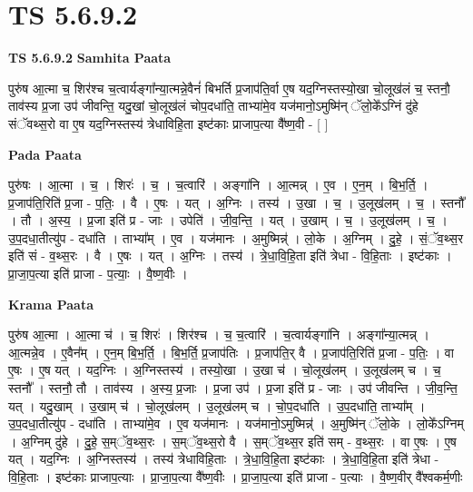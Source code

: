 \documentclass[17pt]{extarticle}
\begin{document}
\section{ TS 5.6.9.2 }

\textbf{TS 5.6.9.2 } \newline
\textbf{Samhita Paata} \newline

पुरु॑ष आ॒त्मा च॒ शिर॑श्च च॒त्वार्यङ्गा᳚न्या॒त्मन्ने॒वैनं॑ बिभर्ति प्र॒जाप॑ति॒र्वा ए॒ष यद॒ग्निस्तस्यो॒खा चो॒लूख॑लं च॒ स्तनौ॒ ताव॑स्य प्र॒जा उप॑ जीवन्ति॒ यदु॒खां चो॒लूख॑लं चोप॒दधा॑ति॒ ताभ्या॑मे॒व यज॑मानो॒ऽमुष्मि॑न् ॅलो॒के᳚ऽग्निं दु॑हे संॅवथ्स॒रो वा ए॒ष यद॒ग्निस्तस्य॑ त्रेधाविहि॒ता इष्ट॑काः प्राजाप॒त्या वै᳚ष्ण॒वी - [  ] \newline

\textbf{Pada Paata} \newline

पुरु॑षः । आ॒त्मा । च॒ । शिरः॑ । च॒ । च॒त्वारि॑ । अङ्गा॑नि । आ॒त्मन्न् । ए॒व । ए॒न॒म् । बि॒भ॒र्ति॒ । प्र॒जाप॑ति॒रिति॑ प्र॒जा - प॒तिः॒ । वै । ए॒षः । यत् । अ॒ग्निः । तस्य॑ । उ॒खा । च॒ । उ॒लूख॑लम् । च॒ । स्तनौ᳚ । तौ । अ॒स्य॒ । प्र॒जा इति॑ प्र - जाः । उपेति॑ । जी॒व॒न्ति॒ । यत् । उ॒खाम् । च॒ । उ॒लूख॑लम् । च॒ । उ॒प॒दधा॒तीत्यु॑प - दधा॑ति । ताभ्या᳚म् । ए॒व । यज॑मानः । अ॒मुष्मिन्न्॑ । लो॒के । अ॒ग्निम् । दु॒हे॒ । सं॒ॅव॒थ्स॒र इति॑ सं - व॒थ्स॒रः । वै । ए॒षः । यत् । अ॒ग्निः । तस्य॑ । त्रे॒धा॒वि॒हि॒ता इति॑ त्रेधा - वि॒हि॒ताः । इष्ट॑काः । प्रा॒जा॒प॒त्या इति॑ प्राजा - प॒त्याः॒ । वै॒ष्ण॒वीः ।  \newline


\textbf{Krama Paata} \newline

पुरु॑ष आ॒त्मा । आ॒त्मा च॑ । च॒ शिरः॑ । शिर॑श्च । च॒ च॒त्वारि॑ । च॒त्वार्यङ्गा॑नि । अङ्गा᳚न्या॒त्मन्न् । आ॒त्मन्ने॒व । ए॒वैन᳚म् । ए॒न॒म् बि॒भ॒र्ति॒ । बि॒भ॒र्ति॒ प्र॒जाप॑तिः । प्र॒जाप॑ति॒र् वै । प्र॒जाप॑ति॒रिति॑ प्र॒जा - प॒तिः॒ । वा ए॒षः । ए॒ष यत् । यद॒ग्निः । अ॒ग्निस्तस्य॑ । तस्यो॒खा । उ॒खा च॑ । चो॒लूख॑लम् । उ॒लूख॑लम् च । च॒ स्तनौ᳚ । स्तनौ॒ तौ । ताव॑स्य । अ॒स्य॒ प्र॒जाः । प्र॒जा उप॑ । प्र॒जा इति॑ प्र - जाः । उप॑ जीवन्ति । जी॒व॒न्ति॒ यत् । यदु॒खाम् । उ॒खाम् च॑ । चो॒लूख॑लम् । उ॒लूख॑लम् च । चो॒प॒दधा॑ति । उ॒प॒दधा॑ति॒ ताभ्या᳚म् । उ॒प॒दधा॒तीत्यु॑प - दधा॑ति । ताभ्या॑मे॒व । ए॒व यज॑मानः । यज॑मानो॒ऽमुष्मिन्न्॑ । अ॒मुष्मि॑न् ॅलो॒के । लो॒के᳚ऽग्निम् । अ॒ग्निम् दु॑हे । दु॒हे॒ स॒म्ॅव॒थ्स॒रः । स॒म्ॅव॒थ्स॒रो वै । स॒म्ॅव॒थ्स॒र इति॑ सम् - व॒थ्स॒रः । वा ए॒षः । ए॒ष यत् । यद॒ग्निः । अ॒ग्निस्तस्य॑ । तस्य॑ त्रेधाविहि॒ताः । त्रे॒धा॒वि॒हि॒ता इष्ट॑काः । त्रे॒धा॒वि॒हि॒ता इति॑ त्रेधा - वि॒हि॒ताः । इष्ट॑काः प्राजाप॒त्याः । प्रा॒जा॒प॒त्या वै᳚ष्ण॒वीः । प्रा॒जा॒प॒त्या इति॑ प्राजा - प॒त्याः । वै॒ष्ण॒वीर् वै᳚श्वकर्म॒णीः \newline
\end{document}
